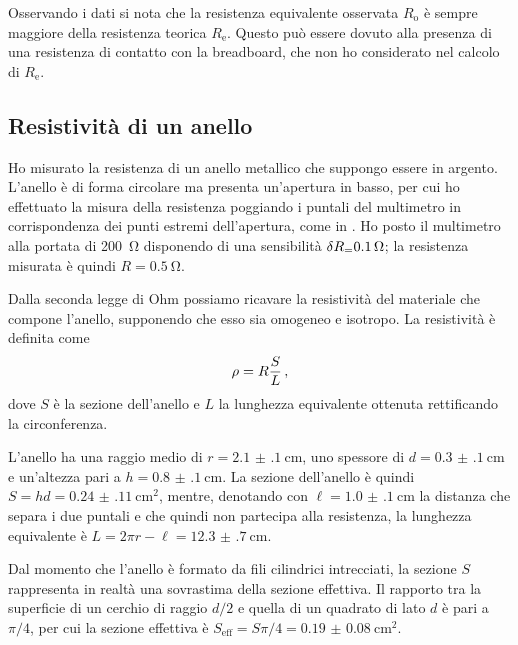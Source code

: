                 Osservando i dati si nota che la resistenza equivalente osservata $R_\text{o}$ è sempre maggiore della resistenza teorica $R_\text{e}$. Questo può essere dovuto alla presenza di una resistenza di contatto con la breadboard, che non ho considerato nel calcolo di $R_\text{e}$.

            \subsection{Resistività di un anello}
                Ho misurato la resistenza di un anello metallico che suppongo essere in argento. L'anello è di forma circolare ma presenta un'apertura in basso, per cui ho effettuato la misura della resistenza poggiando i puntali del multimetro in corrispondenza dei punti estremi dell'apertura, come in . Ho posto il multimetro alla portata di \SI{200}{\ohm} disponendo di una sensibilità $\delta R_\text = \SI{0.1}{\ohm}$; la resistenza misurata è quindi $R = \SI{0.5}{\ohm}$.

                Dalla seconda legge di Ohm possiamo ricavare la resistività del materiale che compone l'anello, supponendo che esso sia omogeneo e isotropo. La resistività è definita come
                \begin{equation}
                    \rho = R\frac{S}{L}
                    \,,
                    \label{eq:mul:ohm-law}
                \end{equation}
                dove $S$ è la sezione dell'anello e $L$ la lunghezza equivalente ottenuta rettificando la circonferenza.

                L'anello ha una raggio medio di $r = \SI{2.1(1)}{\centi\meter}$, uno spessore di $d = \SI{0.3(1)}{\centi\meter}$ e un'altezza pari a $h = \SI{0.8(1)}{\centi\meter}$. La sezione dell'anello è quindi $S = hd = \SI{0.24(11)}{\centi\meter\squared}$, mentre, denotando con $\ell = \SI{1.0(1)}{\centi\meter}$ la distanza che separa i due puntali e che quindi non partecipa alla resistenza, la lunghezza equivalente è $L = 2\pi r - \ell = \SI{12.3(7)}{\centi\meter}$.

                Dal momento che l'anello è formato da fili cilindrici intrecciati, la sezione $S$ rappresenta in realtà una sovrastima della sezione effettiva. Il rapporto tra la superficie di un cerchio di raggio $d/2$ e quella di un quadrato di lato $d$ è pari a $\pi / 4$, per cui la sezione effettiva è $S_\text{eff} = S \pi / \num{4} = \SI{0.19(8)}{\centi\meter\squared}$.
                
